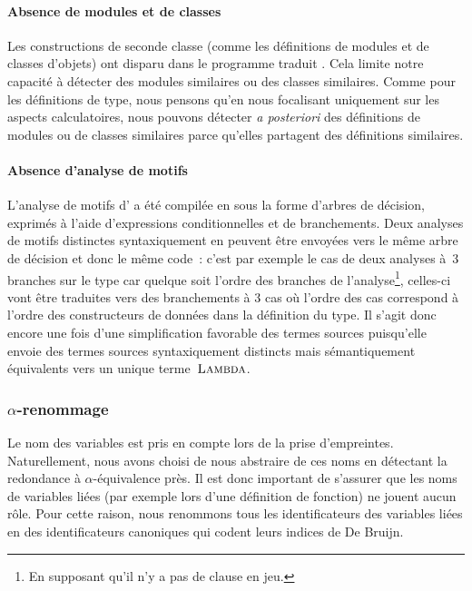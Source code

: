 \paragraph{Absence de modules et de classes}
Les constructions de seconde classe (comme les définitions de modules
et de classes d'objets) ont disparu dans le programme traduit
{\LambdaCode}. Cela limite notre capacité à détecter des modules
similaires ou des classes similaires. Comme pour les définitions de
type, nous pensons qu'en nous focalisant uniquement sur les aspects
calculatoires, nous pouvons détecter \textit{a posteriori} des
définitions de modules ou de classes similaires parce qu'elles
partagent des définitions similaires.

\paragraph{Absence d'analyse de motifs}
L'analyse de motifs d'{\OCaml} a été compilée en {\LambdaCode} sous la
forme d'arbres de décision, exprimés à l'aide d'expressions
conditionnelles et de branchements. Deux analyses de motifs distinctes
syntaxiquement en {\OCaml} peuvent être envoyées vers le même arbre de
décision et donc le même code~\LambdaCode: c'est par exemple le cas de deux
analyses à~$3$ branches sur le type  car quelque soit l'ordre des branches de
l'analyse\footnote{En supposant qu'il n'y a pas de clause
   en jeu.}, celles-ci vont être traduites vers des
branchements à $3$ cas où l'ordre des cas correspond à l'ordre des
constructeurs de données dans la définition du type. Il s'agit donc
encore une fois d'une simplification favorable des termes sources
puisqu'elle envoie des termes sources syntaxiquement distincts mais
sémantiquement équivalents vers un unique terme~$\textsc{Lambda}$.

\subsubsection{$\alpha$-renommage}

Le nom des variables est pris en compte lors de la prise d'empreintes.
Naturellement, nous avons choisi de nous abstraire de ces noms en
détectant la redondance à $\alpha$-équivalence près. Il est donc
important de s'assurer que les noms de variables liées (par exemple
lors d'une définition de fonction) ne jouent aucun rôle. Pour cette
raison, nous renommons tous les identificateurs des variables liées en
des identificateurs canoniques qui codent leurs indices de De Bruijn.

